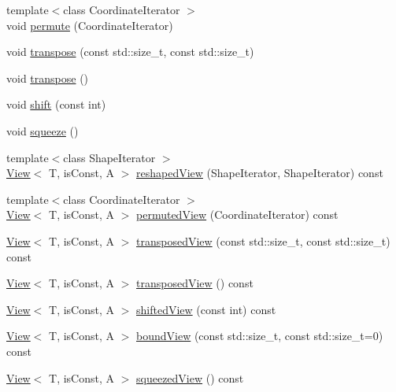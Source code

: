 \begin{DoxyCompactItemize}
\item 
{\footnotesize template$<$class Coordinate\+Iterator $>$ }\\void \hyperlink{classandres_1_1View_a375d3e199e219568d8a6205e4088289b}{permute} (Coordinate\+Iterator)
\item 
void \hyperlink{classandres_1_1View_a3a837dd20fda8c536f9c76894a1f5944}{transpose} (const std\+::size\+\_\+t, const std\+::size\+\_\+t)
\item 
void \hyperlink{classandres_1_1View_ad7acad354a5be4086b9b21ab88b18d82}{transpose} ()
\item 
void \hyperlink{classandres_1_1View_a476957393b3b21333bc665e852da47ad}{shift} (const int)
\item 
void \hyperlink{classandres_1_1View_a922763728fb80d24c32a5e5964537bdb}{squeeze} ()
\item 
{\footnotesize template$<$class Shape\+Iterator $>$ }\\\hyperlink{classandres_1_1View}{View}$<$ T, is\+Const, A $>$ \hyperlink{classandres_1_1View_accc2cf4c41007424b33948b24f1eb61e}{reshaped\+View} (Shape\+Iterator, Shape\+Iterator) const 
\item 
{\footnotesize template$<$class Coordinate\+Iterator $>$ }\\\hyperlink{classandres_1_1View}{View}$<$ T, is\+Const, A $>$ \hyperlink{classandres_1_1View_a278c77d7b10642fffc9ca8b3bc292cd1}{permuted\+View} (Coordinate\+Iterator) const 
\item 
\hyperlink{classandres_1_1View}{View}$<$ T, is\+Const, A $>$ \hyperlink{classandres_1_1View_a08fc7f17dd64241adeefac7493f39f3a}{transposed\+View} (const std\+::size\+\_\+t, const std\+::size\+\_\+t) const 
\item 
\hyperlink{classandres_1_1View}{View}$<$ T, is\+Const, A $>$ \hyperlink{classandres_1_1View_a2045868486d978f41125dd59c4834fa2}{transposed\+View} () const 
\item 
\hyperlink{classandres_1_1View}{View}$<$ T, is\+Const, A $>$ \hyperlink{classandres_1_1View_a267a57ffddb437e19d0a15d342aeebc9}{shifted\+View} (const int) const 
\item 
\hyperlink{classandres_1_1View}{View}$<$ T, is\+Const, A $>$ \hyperlink{classandres_1_1View_ab39dae59df5589ec0311ad67a3c7d000}{bound\+View} (const std\+::size\+\_\+t, const std\+::size\+\_\+t=0) const 
\item 
\hyperlink{classandres_1_1View}{View}$<$ T, is\+Const, A $>$ \hyperlink{classandres_1_1View_a4d454242ebde77898963b7bc41208bb5}{squeezed\+View} () const 
\item 

\end{DoxyCompactItemize}
